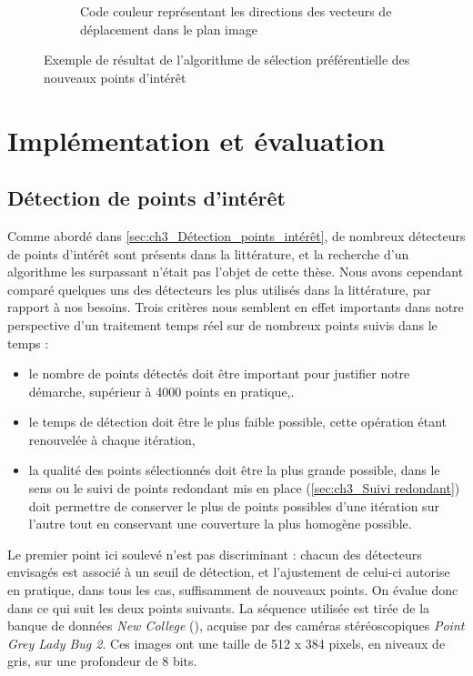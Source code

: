 \begin{figure}[h]
\begin{center}
\begin{subfigure}{0.38\textwidth}
			\caption{Code couleur représentant les directions des vecteurs de déplacement dans le plan image}
			\label{fig:ch3_code_couleur}
		\end{subfigure}	
	\end{center}
	\caption{Exemple de résultat de l'algorithme de sélection préférentielle des nouveaux points d'intérêt}	
	\label{fig:ch3_Weighted_selection}
\end{figure}

\section{Implémentation et évaluation}
\subsection{Détection de points d'intérêt}\label{sec:ch3_Eval_PI}
Comme abordé dans \ref{sec:ch3_Détection_points_intérêt}, de nombreux détecteurs de points d'intérêt sont présents dans la littérature, et la recherche d'un algorithme les surpassant n'était pas l'objet de cette thèse. Nous avons cependant comparé quelques uns des détecteurs les plus utilisés dans la littérature, par rapport à nos besoins. Trois critères nous semblent en effet importants dans notre perspective d'un traitement temps réel sur de nombreux points suivis dans le temps : 
\begin{itemize}
	\item le nombre de points détectés doit être important pour justifier notre démarche, supérieur à 4000 points en pratique,.
	\item le temps de détection doit être le plus faible possible, cette opération étant renouvelée à chaque itération,
	\item la qualité des points sélectionnés doit être la plus grande possible, dans le sens ou le suivi de points redondant mis en place (\ref{sec:ch3_Suivi redondant}) doit permettre de conserver le plus de points possibles d'une itération sur l'autre tout en conservant une couverture la plus homogène possible.
\end{itemize}

Le premier point ici soulevé n'est pas discriminant : chacun des détecteurs envisagés est associé à un seuil de détection, et l'ajustement de celui-ci autorise en pratique, dans tous les cas, suffisamment de nouveaux points. On évalue donc dans ce qui suit les deux points suivants. La séquence utilisée est tirée de la banque de données \textit{New College} (\cite{Smith2009}), acquise par des caméras stéréoscopiques \textit{Point Grey Lady Bug 2}. Ces images ont une taille de 512 x 384 pixels, en niveaux de gris, sur une profondeur de 8 bits.

